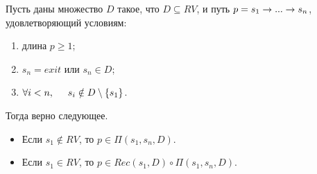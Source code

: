 \begin{lm}
\label{lemma:main}
Пусть даны множество $D$ такое, что $D \subseteq RV$, и путь $p = s_1 \rightarrow ... \rightarrow s_n$, удовлетворяющий условиям:
\begin{enumerate}
    \item длина $p \geq 1$;
    \item $s_n = exit$ или $s_n \in D$;
    \item $\forall i < n, \hspace{5mm} s_i \notin D \setminus \{s_1\}$.
\end{enumerate}
Тогда верно следующее.
\begin{itemize}
    \item Если $s_1 \notin RV$, то $p \in \Pi(s_1,s_n,D)$.  
    \item Если $s_1 \in RV$, то $p \in Rec(s_1,D) \circ \Pi(s_1,s_n,D)$.  
\end{itemize}
\end{lm}

